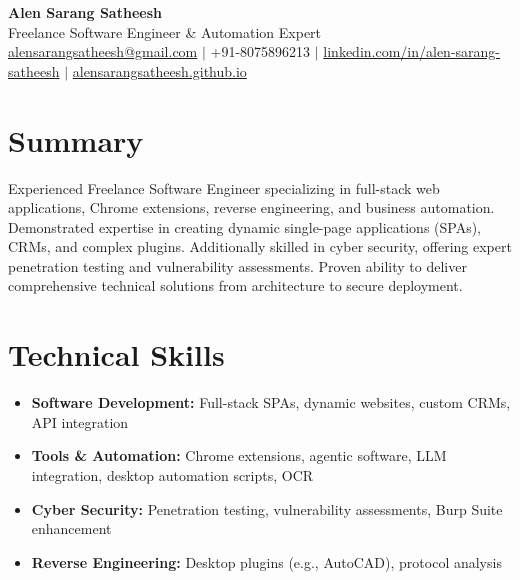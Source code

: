 \documentclass[11pt,a4paper]{article}
\begin{document}
\begin{center}
    {\huge \textbf{Alen Sarang Satheesh}} \\ \vspace{4pt}
    Freelance Software Engineer \& Automation Expert \\ \vspace{4pt}
    \href{mailto:alensarangsatheesh@gmail.com}{alensarangsatheesh@gmail.com} $|$ 
    +91-8075896213 $|$ 
    \href{https://linkedin.com/in/alen-sarang-satheesh}{linkedin.com/in/alen-sarang-satheesh} $|$ 
    \href{https://alensarangsatheesh.github.io}{alensarangsatheesh.github.io}
\end{center}

\vspace{10pt}

\section{Summary}
Experienced Freelance Software Engineer specializing in full-stack web applications, Chrome extensions, reverse engineering, and business automation. Demonstrated expertise in creating dynamic single-page applications (SPAs), CRMs, and complex plugins. Additionally skilled in cyber security, offering expert penetration testing and vulnerability assessments. Proven ability to deliver comprehensive technical solutions from architecture to secure deployment.

\section{Technical Skills}
\begin{itemize}[leftmargin=0.15in, label={}]
    \item \textbf{Software Development:} Full-stack SPAs, dynamic websites, custom CRMs, API integration
    \item \textbf{Tools \& Automation:} Chrome extensions, agentic software, LLM integration, desktop automation scripts, OCR
    \item \textbf{Cyber Security:} Penetration testing, vulnerability assessments, Burp Suite enhancement
    \item \textbf{Reverse Engineering:} Desktop plugins (e.g., AutoCAD), protocol analysis
\end{itemize}
\end{document}
